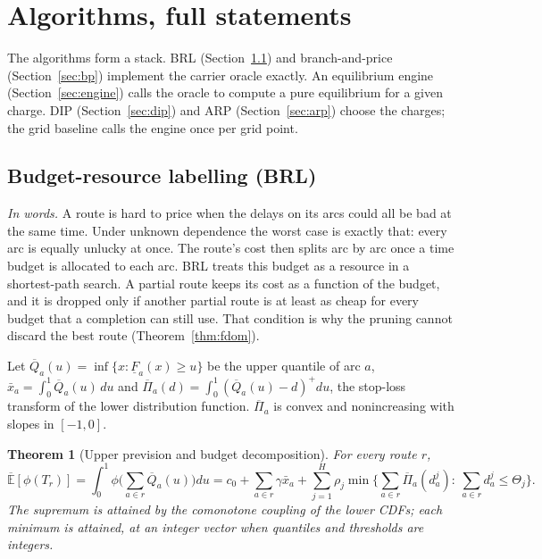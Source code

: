 \documentclass[preprint,11pt]{elsarticle}
\newtheorem{theorem}{Theorem}
\theoremstyle{definition}
\theoremstyle{remark}
\newcommand{\Eu}{\overline{\mathbb{E}}}
\newcommand{\Qb}{\overline{Q}}
\newcommand{\Fl}{\underline{F}}
\newcommand{\Pib}{\overline{\Pi}}
\newcommand{\xb}{\bar x}
\newcommand{\pos}[1]{\left(#1\right)^{+}}
\begin{document}

\section{Algorithms, full statements}\label{sec:algo}

The algorithms form a stack. BRL (Section~\ref{sec:brl}) and branch-and-price (Section~\ref{sec:bp}) implement the carrier oracle exactly. An equilibrium engine (Section~\ref{sec:engine}) calls the oracle to compute a pure equilibrium for a given charge. DIP (Section~\ref{sec:dip}) and ARP (Section~\ref{sec:arp}) choose the charges; the grid baseline calls the engine once per grid point.

\subsection{Budget-resource labelling (BRL)}\label{sec:brl}

\emph{In words.} A route is hard to price when the delays on its arcs could all be bad at the same time. Under unknown dependence the worst case is exactly that: every arc is equally unlucky at once. The route's cost then splits arc by arc once a time budget is allocated to each arc. BRL treats this budget as a resource in a shortest-path search. A partial route keeps its cost as a function of the budget, and it is dropped only if another partial route is at least as cheap for every budget that a completion can still use. That condition is why the pruning cannot discard the best route (Theorem~\ref{thm:fdom}).

Let $\Qb_a(u)=\inf\{x:\Fl_a(x)\ge u\}$ be the upper quantile of arc $a$, $\xb_a=\int_0^1\Qb_a(u)\,du$ and $\Pib_a(d)=\int_0^1\pos{\Qb_a(u)-d}du$, the stop-loss transform of the lower distribution function. $\Pib_a$ is convex and nonincreasing with slopes in $[-1,0]$.

\begin{theorem}[Upper prevision and budget decomposition]\label{thm:brl-main}
For every route $r$,
\[
\Eu[\phi(T_r)]=\int_0^1\phi\Big(\sum_{a\in r}\Qb_a(u)\Big)du
=c_0+\sum_{a\in r}\gamma\xb_a+\sum_{j=1}^{H}\rho_j\min\Big\{\sum_{a\in r}\Pib_a(d^j_a):\ \sum_{a\in r}d^j_a\le\Theta_j\Big\}.
\]
The supremum is attained by the comonotone coupling of the lower CDFs; each minimum is attained, at an integer vector when quantiles and thresholds are integers.
\end{theorem}
\end{document}
